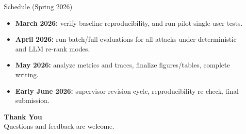 \documentclass[aspectratio=169,11pt]{beamer}
\begin{document}
\begin{frame}{Schedule (Spring 2026)}
\begin{itemize}
  \item \textbf{March 2026:} verify baseline reproducibility, and run pilot single-user tests.
  \item \textbf{April 2026:} run batch/full evaluations for all attacks under deterministic and LLM re-rank modes.
  \item \textbf{May 2026:} analyze metrics and traces, finalize figures/tables, complete writing.
  \item \textbf{Early June 2026:} supervisor revision cycle, reproducibility re-check, final submission.
\end{itemize}
\vspace{0.4em}
\end{frame}

\begin{frame}[plain]
\centering
\vfill
{\Huge \textbf{Thank You}}\\[0.7em]
{\large Questions and feedback are welcome.}
\vfill
\end{frame}
\end{document}
